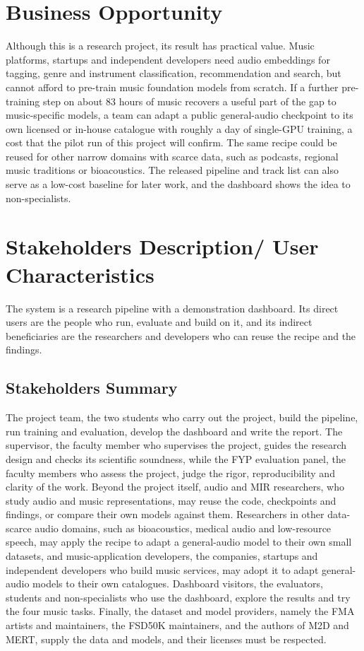 \documentclass{FastFyp}
\begin{document}
\section{Business Opportunity}
\label{sec:vision-business}
Although this is a research project, its result has practical value. Music platforms, startups and independent developers need audio embeddings for tagging, genre and instrument classification, recommendation and search, but cannot afford to pre-train music foundation models from scratch. If a further pre-training step on about 83 hours of music recovers a useful part of the gap to music-specific models, a team can adapt a public general-audio checkpoint to its own licensed or in-house catalogue with roughly a day of single-GPU training, a cost that the pilot run of this project will confirm. The same recipe could be reused for other narrow domains with scarce data, such as podcasts, regional music traditions or bioacoustics. The released pipeline and track list can also serve as a low-cost baseline for later work, and the dashboard shows the idea to non-specialists.

\section{Stakeholders Description/ User Characteristics}
\label{sec:vision-stakeholders}
The system is a research pipeline with a demonstration dashboard. Its direct users are the people who run, evaluate and build on it, and its indirect beneficiaries are the researchers and developers who can reuse the recipe and the findings.

\subsection{Stakeholders Summary}
The project team, the two students who carry out the project, build the pipeline, run training and evaluation, develop the dashboard and write the report. The supervisor, the faculty member who supervises the project, guides the research design and checks its scientific soundness, while the FYP evaluation panel, the faculty members who assess the project, judge the rigor, reproducibility and clarity of the work. Beyond the project itself, audio and MIR researchers, who study audio and music representations, may reuse the code, checkpoints and findings, or compare their own models against them. Researchers in other data-scarce audio domains, such as bioacoustics, medical audio and low-resource speech, may apply the recipe to adapt a general-audio model to their own small datasets, and music-application developers, the companies, startups and independent developers who build music services, may adopt it to adapt general-audio models to their own catalogues. Dashboard visitors, the evaluators, students and non-specialists who use the dashboard, explore the results and try the four music tasks. Finally, the dataset and model providers, namely the FMA artists and maintainers, the FSD50K maintainers, and the authors of M2D and MERT, supply the data and models, and their licenses must be respected.
\end{document}

